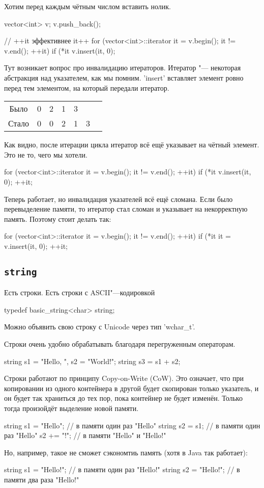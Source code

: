 
Хотим перед каждым чётным числом вставить нолик.
\begin{cppcode}
vector<int> v;
v.push_back();

// ++it эффективнее it++
for (vector<int>::iterator it = v.begin(); it != v.end(); ++it)
{
	if (*it %
		v.insert(it, 0);
}
\end{cppcode}
Тут возникает вопрос про инвалидацию итераторов.
Итератор "--- некоторая абстракция над указателем, как мы помним.
\cpp'insert' вставляет элемент ровно перед тем элементом, на который передали итератор.
\begin{center}
\begin{tabular}{c|cccccc}
Было  & 0 & 2 & 1 & 3 & \\
Стало & 0 & 0 & 2 & 1 & 3
\end{tabular}
\end{center}
Как видно, после итерации цикла итератор всё ещё указывает на чётный элемент. Это не то, чего мы хотели.
\begin{cppcode}
for (vector<int>::iterator it = v.begin(); it != v.end(); ++it)
{
	if (*it %
	{
		v.insert(it, 0);
		++it;
	}
}
\end{cppcode}
Теперь работает, но инвалидация указателей всё ещё сломана.
Если было перевыделение памяти, то итератор стал сломан и указывает на некорректную память. Поэтому стоит делать так:
\begin{cppcode}
for (vector<int>::iterator it = v.begin(); it != v.end(); ++it)
{
	if (*it %
	{
		it = v.insert(it, 0);
		++it;
	}
}
\end{cppcode}

\subsection{\texttt{string}}

Есть строки. Есть строки с ASCII"---кодировкой
\begin{cppcode}
typedef basic_string<char> string;
\end{cppcode}
Можно объявить свою строку с Unicode через тип \cpp'wchar_t'.

Строки очень удобно обрабатывать благодаря перегруженным операторам.
\begin{cppcode}
string s1 = "Hello, ", s2 = "World!";
string s3 = s1 + s2;
\end{cppcode}

Строки работают по принципу Copy-on-Write (CoW).
Это означает, что при копировании из одного контейнера в другой будет скопирован только указатель,
и он будет так храниться до тех пор, пока контейнер не будет изменён.
Только тогда произойдёт выделение новой памяти.
\begin{cppcode}
string s1 = "Hello"; // в памяти один раз "Hello"
string s2 = s1; // в памяти один раз "Hello"
s2 += "!"; // в памяти "Hello" и "Hello!"
\end{cppcode}
Но, например, такое не сможет сэкономтиь память (хотя в Java так работает):
\begin{cppcode}
string s1 = "Hello!"; // в памяти один раз "Hello!"
string s2 = "Hello!"; // в памяти два раза "Hello!"
\end{cppcode}

